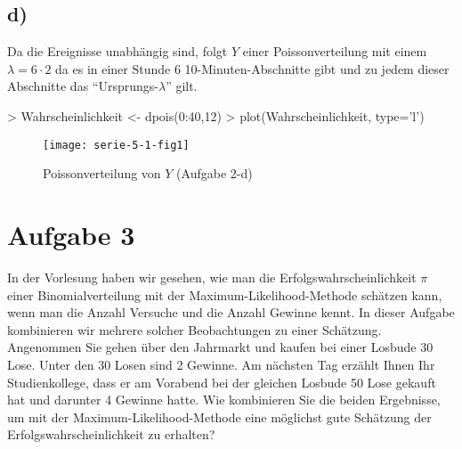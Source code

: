 \subsection*{d)}
Da die Ereignisse unabhängig sind, folgt $Y$ einer Poissonverteilung mit
einem $\lambda = 6 \cdot 2$ da es in einer Stunde 6 10-Minuten-Abschnitte gibt
und zu jedem dieser Abschnitte das ``Ursprungs-$\lambda$'' gilt.
\begin{Schunk}
\begin{Sinput}
> Wahrscheinlichkeit <- dpois(0:40,12)
> plot(Wahrscheinlichkeit, type='l')
\end{Sinput}
\end{Schunk}
\begin{figure}[h]
\begin{center}
\texttt{[image: serie-5-1-fig1]}
\caption{Poissonverteilung von $Y$ (Aufgabe 2-d)}
\end{center}
\end{figure}

\section{Aufgabe 3}
In der Vorlesung haben wir gesehen, wie man die Erfolgswahrscheinlichkeit
$\pi$ einer Binomialverteilung mit der Maximum-Likelihood-Methode schätzen 
kann, wenn man die Anzahl Versuche und die Anzahl Gewinne kennt. In dieser 
Aufgabe kombinieren wir mehrere solcher Beobachtungen zu einer Schätzung.
Angenommen Sie gehen über den Jahrmarkt und kaufen bei einer Losbude 30 Lose. 
Unter den 30 Losen sind 2 Gewinne. Am nächsten Tag erzählt Ihnen Ihr 
Studienkollege, dass er am Vorabend bei der gleichen Losbude 50 Lose gekauft
hat und darunter 4 Gewinne hatte. Wie kombinieren Sie die beiden Ergebnisse, 
um mit der Maximum-Likelihood-Methode eine möglichst gute Schätzung der 
Erfolgswahrscheinlichkeit zu erhalten?

